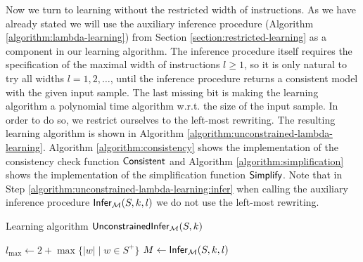 Now we turn to learning without the restricted width of instructions. As we have already stated we will use the auxiliary inference procedure (Algorithm \ref{algorithm:lambda-learning}) from Section \ref{section:restricted-learning} as a component in our learning algorithm. The inference procedure itself requires the specification of the maximal width of instructions $l \ge 1$, so it is only natural to try all widths $l = 1, 2, \ldots$, until the inference procedure returns a consistent model with the given input sample. The last missing bit is making the learning algorithm a polynomial time algorithm w.r.t. the size of the input sample. In order to do so, we restrict ourselves to the left-most rewriting. The resulting learning algorithm is shown in Algorithm \ref{algorithm:unconstrained-lambda-learning}. Algorithm \ref{algorithm:consistency} shows the implementation of the consistency check function \index{$\Consistent$}$\Consistent$ and Algorithm \ref{algorithm:simplification} shows the implementation of the simplification function \index{$\Simplify$}$\Simplify$. Note that in Step \ref{algorithm:unconstrained-lambda-learning:infer} when calling the auxiliary inference procedure \index{$\Infer_{\calM}$}$\textup{\sf Infer}_{\textup{\sf $\mathcal{M}$}}(S, k, l)$ we do not use the left-most rewriting.

\begin{algorithm}
\caption{Learning algorithm $\textup{\sf UnconstrainedInfer}_{\textup{\sf $\mathcal{M}$}}(S, k)$}
\label{algorithm:unconstrained-lambda-learning}
\index{$\UnconstrainedInfer_{\calM}$}
\LinesNumbered
{}
$l_{\max} \leftarrow 2 + \max\{ |w| \mid w \in S^+ \}$\;
{$M \leftarrow \textup{\sf Infer}_{\textup{\sf $\mathcal{M}$}}(S, k, l)$\label{algorithm:unconstrained-lambda-learning:infer}\;
}
\label{algorithm:unconstrained-lambda-learning:end}\;
\end{algorithm}

